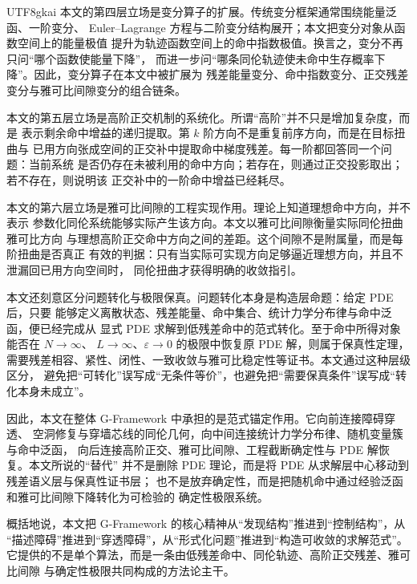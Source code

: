 \documentclass[12pt]{article}
\newcommand{\GFramework}{\textsf{G-Framework}}
\begin{document}
\begin{CJK*}{UTF8}{gkai}
本文的第四层立场是变分算子的扩展。传统变分框架通常围绕能量泛函、一阶变分、
Euler--Lagrange 方程与二阶变分结构展开；本文把变分对象从函数空间上的能量极值
提升为轨迹函数空间上的命中指数极值。换言之，变分不再只问“哪个函数使能量下降”，
而进一步问“哪条同伦轨迹使未命中生存概率下降”。因此，变分算子在本文中被扩展为
残差能量变分、命中指数变分、正交残差变分与雅可比间隙变分的组合链条。

本文的第五层立场是高阶正交机制的系统化。所谓“高阶”并不只是增加复杂度，而是
表示剩余命中增益的递归提取。第 \(k\) 阶方向不是重复前序方向，而是在目标扭曲与
已用方向张成空间的正交补中提取命中梯度残差。每一阶都回答同一个问题：当前系统
是否仍存在未被利用的命中方向；若存在，则通过正交投影取出；若不存在，则说明该
正交补中的一阶命中增益已经耗尽。

本文的第六层立场是雅可比间隙的工程实现作用。理论上知道理想命中方向，并不表示
参数化同伦系统能够实际产生该方向。本文以雅可比间隙衡量实际同伦扭曲雅可比方向
与理想高阶正交命中方向之间的差距。这个间隙不是附属量，而是每阶扭曲是否真正
有效的判据：只有当实际可实现方向足够逼近理想方向，并且不泄漏回已用方向空间时，
同伦扭曲才获得明确的收敛指引。

本文还刻意区分问题转化与极限保真。问题转化本身是构造层命题：给定 PDE 后，只要
能够定义离散状态、残差能量、命中集合、统计力学分布律与命中泛函，便已经完成从
显式 PDE 求解到低残差命中的范式转化。至于命中所得对象能否在 \(N\to\infty\)、
\(L\to\infty\)、\(\varepsilon\to0\) 的极限中恢复原 PDE 解，则属于保真性定理，
需要残差相容、紧性、闭性、一致收敛与雅可比稳定性等证书。本文通过这种层级区分，
避免把“可转化”误写成“无条件等价”，也避免把“需要保真条件”误写成“转化本身未成立”。

因此，本文在整体 \GFramework{} 中承担的是范式锚定作用。它向前连接障碍穿透、
空洞修复与穿墙芯线的同伦几何，向中间连接统计力学分布律、随机变量簇与命中泛函，
向后连接高阶正交、雅可比间隙、工程截断确定性与 PDE 解恢复。本文所说的“替代”
并不是删除 PDE 理论，而是将 PDE 从求解层中心移动到残差语义层与保真性证书层；
也不是放弃确定性，而是把随机命中通过经验泛函和雅可比间隙下降转化为可检验的
确定性极限系统。

概括地说，本文把 \GFramework{} 的核心精神从“发现结构”推进到“控制结构”，从
“描述障碍”推进到“穿透障碍”，从“形式化问题”推进到“构造可收敛的求解范式”。
它提供的不是单个算法，而是一条由低残差命中、同伦轨迹、高阶正交残差、雅可比间隙
与确定性极限共同构成的方法论主干。

\setcounter{tocdepth}{3}
\setcounter{secnumdepth}{3}
\tableofcontents
\clearpage


\end{CJK*}
\end{document}
